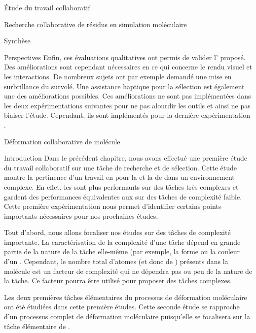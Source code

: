 \documentclass[myfrancais]{mythesis}
\begin{document}
\begin{mypart}{Étude du travail collaboratif}
\begin{mychapter}{Recherche collaborative de résidus en simulation moléculaire}
\begin{mysection}{Synthèse}
\begin{mysubsection}{Perspectives}
					Enfin, ces évaluations qualitatives ont permis de valider l' proposé.
					Des améliorations sont cependant nécessaires en ce qui concerne le rendu visuel et les interactions.
					De nombreux sujets ont par exemple demandé une mise en surbrillance du  survolé.
					Une assistance haptique pour la sélection est également une des améliorations possibles.
					Ces améliorations ne sont pas implémentées dans les deux expérimentations suivantes pour ne pas alourdir les outils et ainsi ne pas biaiser l'étude.
					Cependant, ils sont implémentés pour la dernière expérimentation .
				\end{mysubsection}
			\end{mysection}
		\end{mychapter}
		\begin{mychapter}{Déformation collaborative de molécule}
			\begin{mysection}{Introduction}
				Dans le précédent chapitre, nous avons effectué une première étude du travail collaboratif sur une tâche de recherche et de sélection.
				Cette étude montre la pertinence d'un travail en  pour la  et la  de  dans un environnement complexe.
				En effet, les  sont plus performants sur des tâches très complexes et gardent des performances équivalentes aux  sur des tâches de complexité faible.
				Cette première expérimentation nous permet d'identifier certains points importants nécessaires pour nos prochaines études.

				Tout d'abord, nous allons focaliser nos études sur des tâches de complexité importante.
				La caractérisation de la complexité d'une tâche dépend en grande partie de la nature de la tâche elle-même (par exemple, la forme ou la couleur d'un .
				Cependant, le nombre total d'atomes (et donc de ) présents dans la molécule est un facteur de complexité qui ne dépendra pas ou peu de la nature de la tâche.
				Ce facteur pourra être utilisé pour proposer des tâches complexes.

				Les deux premières tâches élémentaires du processus de déformation moléculaire  ont été étudiées dans cette première études.
				Cette seconde étude se rapproche d'un processus complet de déformation moléculaire puisqu'elle se focalisera sur la tâche élémentaire de .


\end{mysection}
\end{mychapter}
\end{mypart}
\end{document}
